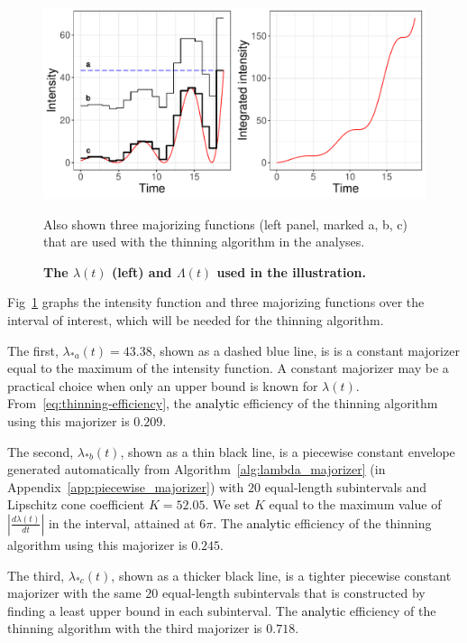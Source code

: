 \documentclass[article,nojss]{jss}\usepackage[]{graphicx}\usepackage[]{xcolor}
\makeatletter
\def\maxwidth{ %
  \ifdim\Gin@nat@width>\linewidth
    \linewidth
  \else
    \Gin@nat@width
  \fi
}
\newcommand{\der}[2]{\frac{d {#1}} {d{#2}}}
\newcommand{\red}[1]{\textcolor{black}{#1}}
\makeatother
\begin{document}
\begin{Schunk}
\begin{figure}

\caption[The $\lambda(t)$ (left) and $\Lambda(t)$ used in the illustration]{{\bf The $\lambda(t)$ (left) and $\Lambda(t)$ used in the illustration.}}\label{fig:example-function-plot}
\includegraphics[width=\maxwidth]{figure/example-function-plot-1} 
\begin{flushleft}
Also shown three majorizing functions (left panel, marked a, b, c) that are used with the thinning algorithm in the analyses.
\end{flushleft}
\end{figure}
\end{Schunk}

Fig~\ref{fig:example-function-plot} graphs the intensity function and three majorizing functions over the interval of interest, which will be needed for the thinning algorithm.

The first, $\lambda_{*a}(t) = 43.38$, shown as a dashed blue line, is is a constant majorizer equal to the maximum of the intensity function. A constant majorizer may be a practical choice when only an upper bound is known for $\lambda(t)$.
From~\eqref{eq:thinning-efficiency}, the \red{analytic} efficiency of the thinning algorithm using this majorizer is
$0.209$.

The second, $\lambda_{*b}(t)$, shown as a thin black line, is a piecewise constant envelope generated automatically from Algorithm~\ref{alg:lambda_majorizer} 
(in Appendix~\ref{app:piecewise_majorizer}) with $20$ equal-length subintervals and Lipschitz cone coefficient ${K = 52.05}$. We set $K$ equal to the maximum value of $|\der{\lambda(t)}{t}|$ in the interval, attained at $6\pi$.
The \red{analytic} efficiency of the thinning algorithm using this majorizer is
$0.245$.

The third, $\lambda_{*c}(t)$, shown as a thicker black line, is a tighter piecewise constant majorizer with the same $20$ equal-length subintervals that is constructed by finding a least upper bound in each subinterval. The \red{analytic} efficiency of the thinning algorithm with the third
majorizer is
$0.718$.
\end{document}

